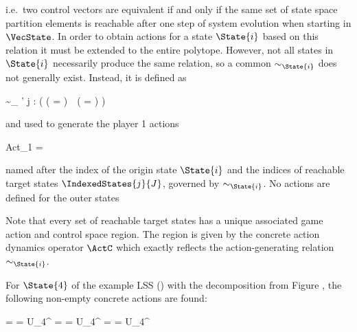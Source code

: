     i.e.\ two control vectors are equivalent if and only if the same set of state space partition elements is reachable after one step of system evolution when starting in $\VecState$.
    In order to obtain actions for a state $\State{i}$ based on this relation it must be extended to the entire polytope.
    However, not all states in $\State{i}$ necessarily produce the same relation, so a common $\sim_{\State{i}}$ does not generally exist.
    Instead, it is defined as

    \startformula
        \VecControl \sim_{} \VecControl' \;\Longleftrightarrow\;
        \forall j \in \StateIndices: \Big(
            (  \cap {} = \emptyset ) \,\leftrightarrow\,
            (  \cap {} = \emptyset )
        \Big)
    \stopformula

    and used to generate the player 1 actions

    \startformula
        Act_1 =  \EndComma
    \stopformula

    named after the index of the origin state $\State{i}$ and the indices of reachable target states $\IndexedStates{j}{J}$, governed by $\sim_{\State{i}}$.
    No actions are defined for the outer states 

    \startformula
         \EndPeriod
    \stopformula

    Note that every set of reachable target states has a unique associated game action and control space region.
    The region is given by the concrete action dynamics operator $\ActC$ which exactly reflects the action-generating relation $\sim_{\State {i}}$.

    For $\State{4}$ of the example LSS () with the decomposition from Figure , the following non-empty concrete actions are found:

    \startformula
        \startalign[n=3,align={left,left,left}]
            \NC {}
            \NC = 
            \NC = U_4^{} \EndComma
            \NR
            \NC {}
            \NC = 
            \NC = U_4^{} \EndAnd
            \NR
            \NC {}
            \NC = 
            \NC = U_4^{} \EndPeriod
            \NR
        \stopalign
    \stopformula

